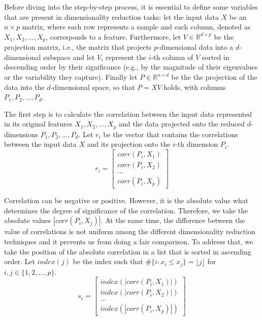 Before diving into the step-by-step process, it is essential to define some variables that are present in dimensionality reduction tasks: let the input data $X$ be an $n \times p$ matrix, where each row represents a sample and each column, denoted as $X_1, X_2, ..., X_p$, corresponds to a feature. Furthermore, let $V \in \mathbb{R}^{d \times p}$ be the projection matrix, i.e., the matrix that projects $p$-dimensional data into a $d$-dimensional subspace and let $V_i$ represent the $i$-th column of $V$ sorted in descending order by their significance (e.g., by the magnitude of their eigenvalues or the variability they capture). Finally let $P \in \mathbb{R}^{n \times d}$ be the the projection of the data into the $d$-dimensional space, so that $P = XV$ holds, with columns $P_1, P_2,..., P_d$.

The first step is to calculate the correlation between the input data represented in its original features $X_1, X_2, ..., X_p$ and the data projected onto the reduced $d$-dimensions $P_1, P_2, ..., P_d$. Let $r_i$ be the vector that contains the correlations between the input data $X$ and its projection onto the $i$-th dimension $P_i$.
$$
    r_i =
    \begin{bmatrix}
        corr(P_i, X_1) \\
        corr(P_i, X_2) \\
        ...            \\
        corr(P_i, X_p)
    \end{bmatrix}
$$

Correlation can be negative or positive. However, it is the absolute value what determines the degree of significance of the correlation. Therefore, we take the absolute values $|corr(P_i,X_j)|$. At the same time, the difference between the value of correlations is not uniform among the different dimensionality reduction techniques and it prevents us from doing a fair comparison. To address that, we take the position of the absolute correlation in a list that is sorted in ascending order. Let $index(j)$ be the index such that $\#\{i : x_i \leq x_j\} = \lfloor j \rfloor$ for $i, j \in \{1,2,...,p\}$.
$$
    s_i =
    \begin{bmatrix}
        index(|corr(P_i, X_1)|) \\
        index(|corr(P_i, X_2)|) \\
        ...                     \\
        index(|corr(P_i, X_p)|)
    \end{bmatrix}
$$

